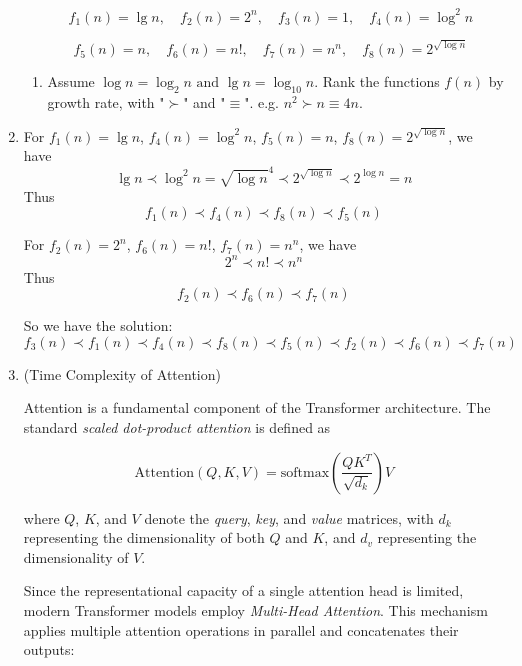 \documentclass[12pt,a4paper]{article}
\makeatletter
\newtheorem*{solution}{Solution}
\theoremstyle{definition}
\renewenvironment{solution}[1][Solution] {\par\pushQED{\qed}\normalfont\topsep6\p@\@plus6\p@\relax\trivlist\item[\hskip\labelsep\bfseries#1\@addpunct{.}]\ignorespaces}{\popQED\endtrivlist\@endpefalse} \makeatother
\makeatother
\begin{document}
\begin{enumerate}
    \[
    \quad f_1(n) = \lg n, \quad f_2(n) = 2^n, \quad f_3(n) = 1, \quad f_4(n) = \log^2{n}
    \]
    
    \[
    \quad f_5(n) = n, \quad f_6(n) = n!, \quad f_7(n) = n^n, \quad f_8(n) = 2^{\sqrt{\log n}}
    \]


    \begin{enumerate}
        \item Assume $\log n = \log_2 n \text{ and } \lg n = \log_{10} n$. Rank the functions $f(n)$ by growth rate, with "$\succ$" and "$\equiv$". e.g. $n^2\succ n \equiv 4n$. 
    \end{enumerate}

\begin{solution}
    For $f_1(n) = \lg n$, $f_4(n) = \log^2{n}$, $f_5(n) = n$, $f_8(n) = 2^{\sqrt{\log n}}$, we have \[
    \lg n \prec \log^2{n} = \sqrt{\log{n}}^4 \prec 2^{\sqrt{\log n}} \prec 2^{\log n} = n
    \]
    Thus\[
     f_1(n) \prec f_4(n) \prec f_8(n) \prec f_5(n)
    \]
    
    For $f_2(n) = 2^n$, $f_6(n) = n!$, $f_7(n) = n^n$, we have \[
    2^n \prec n! \prec n^n
    \]
    Thus 
    \[
    f_2(n) \prec f_6(n) \prec f_7(n)
    \]
    
    So we have the solution:
    \[
    \boxed{f_3(n) \prec f_1(n) \prec f_4(n) \prec f_8(n) \prec f_5(n) \prec f_2(n) \prec f_6(n) \prec f_7(n)}
    \]
    
\end{solution}
    
    \smallskip
    \item {\color{purple}(Time Complexity of Attention)}
    
    Attention is a fundamental component of the Transformer architecture. 
    The standard \textit{scaled dot-product attention} is defined as
    
    \begin{equation}
        \text{Attention}(Q, K, V) = 
        \text{softmax}\!\left(\frac{QK^{T}}{\sqrt{d_k}}\right)V
    \end{equation}
    
    where $Q$, $K$, and $V$ denote the \textit{query}, \textit{key}, and \textit{value} matrices, with $d_k$ representing the dimensionality of both $Q$ and $K$, and $d_v$ representing the dimensionality of $V$.
    
    Since the representational capacity of a single attention head is limited, modern Transformer models employ \textit{Multi-Head Attention}. This mechanism applies multiple attention operations in parallel and concatenates their outputs:
    

\end{enumerate}
\end{document}
